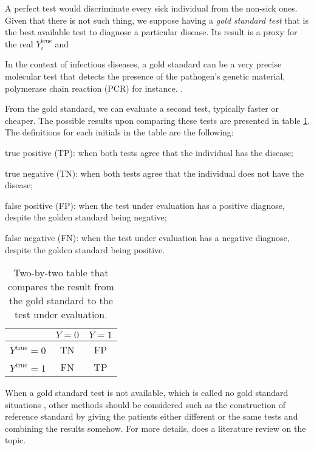 A perfect test would discriminate every sick individual from the non-sick ones.
Given that there is not such thing, we suppose having a {\em gold standard
test} that is the best available test \cite{versi1992gold} to diagnose a
particular disease. Its result is a proxy for the real $Y^{\mathrm{true}}_i$ and 

\begin{citacao}
  In the context of infectious diseases, a gold standard can be a very precise
  molecular test that detects the presence of the pathogen’s genetic material,
  polymerase chain reaction (PCR) for instance. \cite[p. 125]{bastos2021modelling}.
\end{citacao}

From the gold standard, we can evaluate a second test, typically faster or
cheaper. The possible results upon comparing these tests are presented in
table \ref{table:two-by-two}. The definitions for each initials in the table
are the following: 

\begin{alineas}
  \item true positive (TP): when both tests agree that the individual has the
  disease;
  \item true negative (TN): when both tests agree that the individual does not
  have the disease;
  \item false positive (FP): when the test under evaluation has a positive
  diagnose, despite the golden standard being negative;
  \item false negative (FN): when the test under evaluation has a negative
  diagnose, despite the golden standard being positive.
\end{alineas}

\begin{table}[!ht]
  \centering
  \begin{tabular}{c|c|c|}
  \cline{2-3}
                                               & $Y = 0$ & $Y = 1$ \\ \hline
  \multicolumn{1}{|c|}{$Y^{\mathrm{true}}= 0$} & TN    & FP    \\ \hline
  \multicolumn{1}{|c|}{$Y^{\mathrm{true}}= 1$} & FN    & TP    \\ \hline
  \end{tabular}
  \caption{Two-by-two table that compares the result from the gold standard to
  the test under evaluation.}
  \label{table:two-by-two}
\end{table}

\begin{remark}
  When a gold standard test is not available, which is called no gold standard
  situations \cite[p. 1]{rutjes2007evaluation}, other methods should be
  considered such as the construction of reference standard by giving the
  patients either different or the same tests and combining the results
  somehow. For more details, \textcite{rutjes2007evaluation} does a literature
 review on the topic.  
\end{remark}

